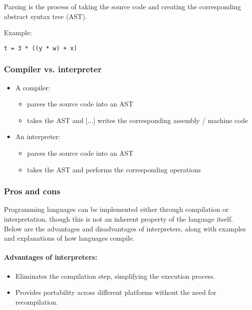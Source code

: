 \documentclass[12pt]{article}
\begin{document}
Parsing is the process of taking the source code and creating the corresponding abstract syntax tree (AST).

Example:

\begin{verbatim}
t = 3 * ((y * w) + x)
\end{verbatim}


\subsubsection{Compiler vs. interpreter}

\begin{itemize}
  \item A compiler:
  \begin{itemize}
    \item parses the source code into an AST
    \item takes the AST and [...] writes the corresponding assembly / machine code
  \end{itemize}
  \item An interpreter:
  \begin{itemize}
    \item parses the source code into an AST
    \item takes the AST and performs the corresponding operations
  \end{itemize}
\end{itemize}

\subsubsection{Pros and cons}
Programming languages can be implemented either through compilation or interpretation, though this is not an inherent property of the language itself. Below are the advantages and disadvantages of interpreters, along with examples and explanations of how languages compile.

\paragraph{Advantages of interpreters:}
\begin{itemize}
    \item Eliminates the compilation step, simplifying the execution process.
    \item Provides portability across different platforms without the need for recompilation.
\end{itemize}
\end{document}
